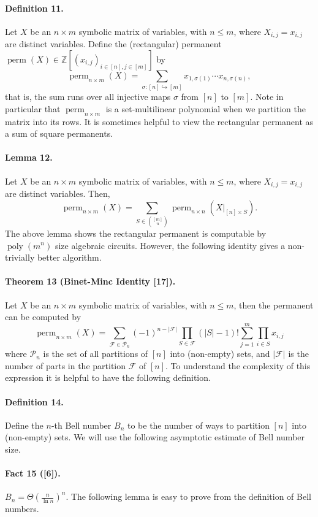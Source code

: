 \documentclass[10pt,a4paper]{article}
\begin{document}
\paragraph{Definition 11.} Let $X$ be an $n\times m$ symbolic matrix of variables, with $n\le m$, where $X_{i,j}=x_{i,j}$ are distinct variables. Define the (rectangular) permanent $\operatorname{perm}(X)\in\mathbb Z[(x_{i,j})_{i\in[n],j\in[m]}]$ by
\[\operatorname{perm}_{n\times m}(X)=\sum_{\sigma:[n]\hookrightarrow[m]}x_{1,\sigma(1)}\cdots x_{n,\sigma(n)},\]
that is, the sum runs over all injective maps $\sigma$ from $[n]$ to $[m]$.
Note in particular that $\operatorname{perm}_{n\times m}$ is a set-multilinear polynomial when we partition the matrix into its rows.
It is sometimes helpful to view the rectangular permanent as a sum of square permanents.
\paragraph{Lemma 12.} Let $X$ be an $n\times m$ symbolic matrix of variables, with $n\le m$, where $X_{i,j}=x_{i,j}$ are distinct variables. Then,
\[\operatorname{perm}_{n\times m}(X)=\sum_{S\in\binom{[m]}n}\operatorname{perm}_{n\times n}(X|_{[n]\times S}).\]
The above lemma shows the rectangular permanent is computable by $\operatorname{poly}(m^n)$ size algebraic circuits. However, the following identity gives a non-trivially better algorithm.
\paragraph{Theorem 13 (Binet-Minc Identity [17]).} Let $X$ be an $n\times m$ symbolic matrix of variables, with $n\le m$, then the permanent can be computed by
\[\operatorname{perm}_{n\times m}(X)=\sum_{\mathcal F\in\mathcal P_n}(-1)^{n-|\mathcal F|}\prod_{S\in\mathcal F}(|S|-1)!\sum_{j=1}^m\prod_{i\in S}x_{i,j}\]
where $\mathcal P_n$ is the set of all partitions of $[n]$ into (non-empty) sets, and $|\mathcal F|$ is the number of parts in the partition $\mathcal F$ of $[n]$.
To understand the complexity of this expression it is helpful to have the following definition.
\paragraph{Definition 14.} Define the $n$-th Bell number $B_n$ to be the number of ways to partition $[n]$ into (non-empty) sets.
We will use the following asymptotic estimate of Bell number size.
\paragraph{Fact 15 ([6]).} $B_n=\Theta(\frac n{\ln n})^n$.
The following lemma is easy to prove from the definition of Bell numbers.
\end{document}
